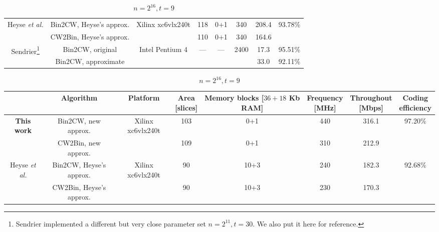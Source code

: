 \documentclass[10pt,journal,compsoc]{IEEEtran}
\begin{document}
\begin{table}[!htb]
\begin{minipage}{\textwidth}
\begin{subtable}[t]{0.95\linewidth}
\begin{tabular}{cccccccc}
    \hline
    \multirow{2}{*}{Heyse \textit{et al.}\cite{heyse2012towards} } & Bin2CW, Heyse's approx. & \multirow{2}{*}{Xilinx xc6vlx240t} & 118 & 0+1 &340  &208.4 &\multirow{2}{*}{93.78\%}\\
                                        & CW2Bin, Heyse's approx. & & 110 & 0+1 & 340 &164.6 & \\

    \hline
    \multirow{2}{*}{Sendrier\cite{sendrier2005encoding}\footnote[$\ast$]{Sendrier implemented a different but very close parameter set $n=2^{11},t=30$. We also put it here for reference.}} & Bin2CW, original & \multirow{2}{*}{Intel Pentium 4} &\multirow{2}{*}{---}  & \multirow{2}{*}{---} & \multirow{2}{*}{2400} & 17.3 &95.51\%\\
                                        & Bin2CW, approximate & &  &  &  & 33.0 & 92.11\%\\

    \hline
    \end{tabular}
\end{subtable}
\end{minipage}
\vspace{1.5em}

\begin{subtable}[t]{0.95\linewidth}\centering
    \caption{$n=2^{16}, t=9$}
    \begin{tabular}{cccccccc}\hline
    &   Algorithm & Platform & \tabincell{c}{Area\\{}[slices]} & \tabincell{c}{Memory blocks\\{}[$36+18$ Kb RAM]} & \tabincell{c}{Frequency\\{}[MHz]} & \tabincell{c}{Throughout\\{}[Mbps]} & \tabincell{c}{Coding\\efficiency}\\
    \hline
     \multirow{2}{*}{\textbf{This work}} & Bin2CW, new approx. & \multirow{2}{*}{Xilinx xc6vlx240t} & 103 & 0+1 & 440 &316.1 & \multirow{2}{*}{97.20\%}\\
                                        & CW2Bin, new approx. &  & 109 & 0+1 & 310 &212.9 & \\

    \hline
    \multirow{2}{*}{Heyse \textit{et al.}\cite{heyse2012towards}} & Bin2CW, Heyse's approx. & \multirow{2}{*}{Xilinx xc6vlx240t} & 90 & 10+3 & 240 &182.3&\multirow{2}{*}{92.68\%}\\
                                        & CW2Bin, Heyse's approx. & & 90 & 10+3 & 230 & 170.3&\\


\end{tabular}
\end{subtable}
\end{table}
\end{document}

